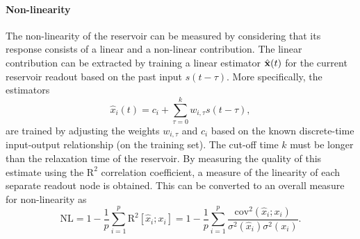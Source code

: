\paragraph{Non-linearity}
The non-linearity of the reservoir can be measured by considering that its response consists of a linear and a non-linear contribution.
The linear contribution can be extracted by training a linear estimator $\hat{\boldsymbol{\mathbf{x}}}(t)$ for the current reservoir readout based on the past input $s(t - \tau)$.
More specifically, the estimators
\begin{equation}
	\hat{x}_i(t) = c_i + \sum_{\tau=0}^{k} w_{i,\tau} s(t - \tau) \mathrm{,}
\end{equation}
are trained by adjusting the weights $w_{i,\tau}$ and $c_i$ based on the known discrete-time input-output relationship (on the training set).
The cut-off time $k$ must be longer than the relaxation time of the reservoir.
By measuring the quality of this estimate using the $\mathrm{R}^2$ correlation coefficient, a measure of the linearity of each separate readout node is obtained.
This can be converted to an overall measure for non-linearity as
\begin{equation}
	\mathrm{NL} = 1 - \frac{1}{p} \sum_{i=1}^p \mathrm{R}^2[\hat{x}_i;x_i] = 1 - \frac{1}{p} \sum_{i=1}^p \frac{\mathrm{cov}^2(\hat{x}_i; x_i)}{\sigma^2(\hat{x}_i) \sigma^2(x_i)} \mathrm{.}
\end{equation}

